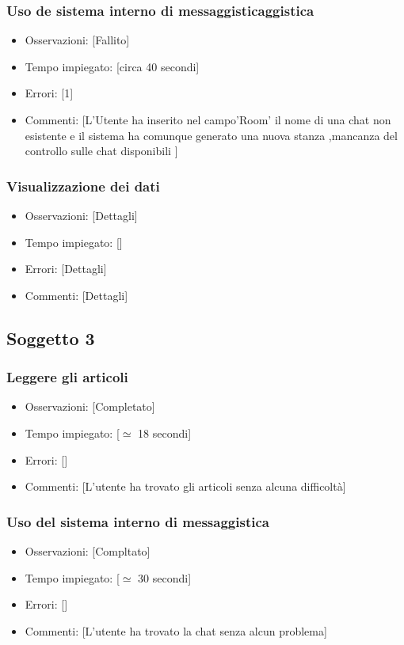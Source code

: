 \documentclass[a4paper,12pt]{article}
\begin{document}
\subsubsection{Uso de sistema interno di messaggisticaggistica}
\begin{itemize}
    \item Osservazioni: [Fallito]
    \item Tempo impiegato: [circa 40 secondi]
    \item Errori: [1]
    \item Commenti: [L'Utente ha inserito nel campo'Room' il nome di una chat non esistente e il sistema ha comunque generato una nuova stanza ,mancanza del controllo sulle chat disponibili ]
\end{itemize}
\subsubsection{Visualizzazione dei dati}
\begin{itemize}
    \item Osservazioni: [Dettagli]
    \item Tempo impiegato: []
    \item Errori: [Dettagli]
    \item Commenti: [Dettagli]
\end{itemize}

\subsection{Soggetto 3}
\subsubsection{Leggere gli articoli}
\begin{itemize}
    \item Osservazioni: [Completato]
    \item Tempo impiegato: [$\simeq$ 18 secondi]
    \item Errori: []
    \item Commenti: [L'utente ha trovato gli articoli senza alcuna difficoltà]
\end{itemize}
\subsubsection{Uso del sistema interno di messaggistica}
\begin{itemize}
    \item Osservazioni: [Compltato]
    \item Tempo impiegato: [$\simeq$ 30 secondi]
    \item Errori: []
    \item Commenti: [L'utente ha trovato la chat senza alcun problema]
\end{itemize}
\end{document}
